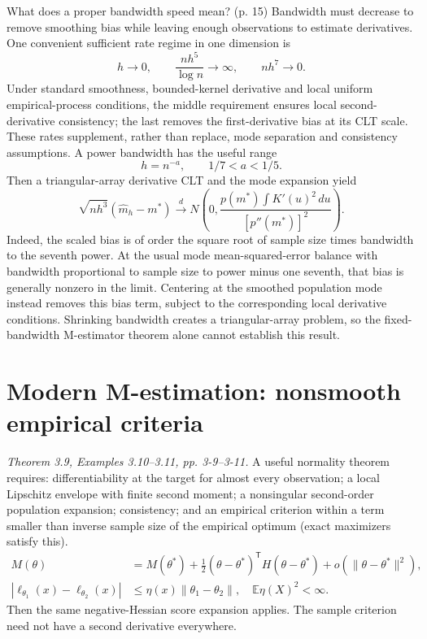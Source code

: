 \documentclass[12pt]{article}
\newcommand{\E}{\mathbb E}
\begin{document}
\begin{todobox}{What does a proper bandwidth speed mean? (p. 15)}
Bandwidth must decrease to remove smoothing bias while leaving enough
observations to estimate derivatives. One convenient sufficient rate
regime in one dimension is
\begin{equation}
 h\to0,\qquad \frac{nh^5}{\log n}\to\infty,\qquad nh^7\to0.
\end{equation}
Under standard smoothness, bounded-kernel derivative and local uniform
empirical-process conditions, the middle requirement ensures local
second-derivative consistency; the last removes the first-derivative bias
at its CLT scale. These rates supplement, rather than replace, mode
separation and consistency assumptions. A power bandwidth has the useful
range
\begin{equation}
 h=n^{-a},\qquad 1/7<a<1/5.
\end{equation}
Then a triangular-array derivative CLT and the mode expansion yield
\begin{equation}
 \sqrt{nh^3}(\widehat m_h-m^*)\xrightarrow{d}
 N\left(0,\frac{p(m^*)\int K'(u)^2\,du}{[p''(m^*)]^2}\right).
\end{equation}
Indeed, the scaled bias is of order the square root of sample size times
bandwidth to the seventh power. At the usual mode mean-squared-error
balance with bandwidth proportional to sample size to power minus one
seventh, that bias is generally nonzero in the limit. Centering at the
smoothed population mode instead removes this bias term, subject to the
corresponding local derivative conditions. Shrinking bandwidth creates a
triangular-array problem, so the fixed-bandwidth M-estimator theorem alone
cannot establish this result.
\end{todobox}

\section{Modern M-estimation: nonsmooth empirical criteria}
\textit{Theorem 3.9, Examples 3.10--3.11, pp. 3-9--3-11.}
A useful normality theorem requires: differentiability at the target for
almost every observation; a local Lipschitz envelope with finite second
moment; a nonsingular second-order population expansion; consistency; and
an empirical criterion within a term smaller than inverse sample size of
the empirical optimum (exact maximizers satisfy this).
\begin{align}
 M(\theta)&=M(\theta^*)+\tfrac12(\theta-\theta^*)^{\mathsf T}
 H(\theta-\theta^*)+o(\|\theta-\theta^*\|^2),\\
 |\ell_{\theta_1}(x)-\ell_{\theta_2}(x)|&\le\eta(x)\|\theta_1-\theta_2\|,
 \quad\E\eta(X)^2<\infty.
\end{align}
Then the same negative-Hessian score expansion applies. The sample
criterion need not have a second derivative everywhere.
\end{document}
